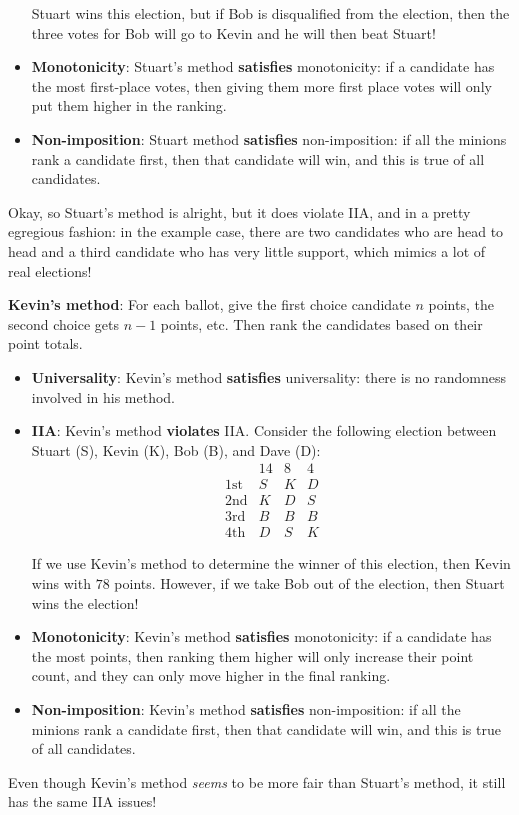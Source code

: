 \documentclass{article}
\begin{document}
\begin{multicols}{3}
\begin{itemize}
	Stuart wins this election, but if Bob is disqualified from the election, then the three votes for Bob will go to Kevin and he will then beat Stuart! 
	\item \textbf{Monotonicity}: Stuart’s method {\textbf{satisfies}} monotonicity: if a candidate has the most first-place votes, then giving them more first place votes will only put them higher in the ranking. 
	\item \textbf{Non-imposition}: Stuart method {\textbf{satisfies}} non-imposition: if all the minions rank a candidate first, then that candidate will win, and this is true of all candidates. 
\end{itemize}
Okay, so Stuart’s method is alright, but it does violate IIA, and in a pretty egregious fashion: in the example case, there are two candidates who are head to head and a third candidate who has very little support, which mimics a lot of real elections! 

\textbf{Kevin’s method}: For each ballot, give the first choice candidate $n$ points, the second choice gets $n-1$ points, etc. Then rank the candidates based on their point totals. 
\begin{itemize}
	\item \textbf{Universality}: Kevin’s method \textbf{satisfies} universality: there is no randomness involved in his method.
	\item \textbf{IIA}: Kevin’s method {\textbf{violates}} IIA. Consider the following election between Stuart (S), Kevin (K), Bob (B), and Dave (D):
	\[
		\begin{array}{c|ccc}
				& 14 & 8 & 4 \\
			\text{1st} & S & K & D \\
			\text{2nd} & K & D & S \\
			\text{3rd} & B & B & B \\
			\text{4th} & D & S & K
		\end{array}
	\]

	If we use Kevin’s method to determine the winner of this election, then Kevin wins with $78$ points. However, if we take Bob out of the election, then Stuart wins the election! 
	\item \textbf{Monotonicity}: Kevin’s method {\textbf{satisfies}} monotonicity: if a candidate has the most points, then ranking them higher will only increase their point count, and they can only move higher in the final ranking.
	\item \textbf{Non-imposition}: Kevin’s method {\textbf{satisfies}} non-imposition: if all the minions rank a candidate first, then that candidate will win, and this is true of all candidates. 
\end{itemize}
Even though Kevin’s method \textit{seems} to be more fair than Stuart's method, it still has the same IIA issues! 


\end{multicols}
\end{document}
